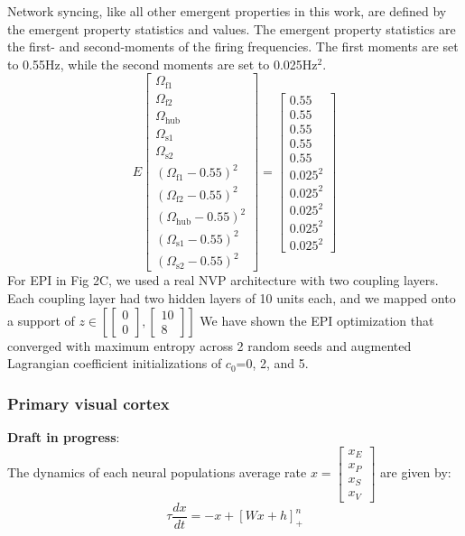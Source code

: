 \documentclass[11pt]{article}
\begin{document}
Network syncing, like all other emergent properties in this work, are defined by the emergent property statistics and values.  The emergent property statistics are the first- and second-moments of the firing frequencies. The first moments are set to 0.55Hz, while the second moments are set to 0.025Hz$^2$.
\begin{equation}
E \begin{bmatrix} \Omega_{\text{f1}} \\ \Omega_{\text{f2}} \\ \Omega_{\text{hub}} \\ \Omega_{\text{s1}} \\ \Omega_{\text{s2}} \\ (\Omega_{\text{f1}} - 0.55)^2 \\ (\Omega_{\text{f2}} - 0.55)^2 \\ (\Omega_{\text{hub}} - 0.55)^2 \\ (\Omega_{\text{s1}} - 0.55)^2 \\ (\Omega_{\text{s2}} - 0.55)^2  \end{bmatrix} = \begin{bmatrix} 0.55 \\ 0.55 \\ 0.55 \\ 0.55 \\ 0.55 \\ 0.025^2 \\ 0.025^2 \\ 0.025^2 \\ 0.025^2 \\ 0.025^2 \end{bmatrix}
\end{equation}
For EPI in Fig 2C, we used a real NVP architecture with two coupling layers.  Each coupling layer had two hidden layers of 10 units each, and we mapped onto a support of $z \in \left[ \begin{bmatrix} 0 \\ 0 \end{bmatrix}, \begin{bmatrix} 10 \\ 8 \end{bmatrix} \right]$  We have shown the EPI optimization that converged with maximum entropy across 2 random seeds and augmented Lagrangian coefficient initializations of $c_0$=0, 2, and 5.

\subsubsection{Primary visual cortex}\label{methods_V1}
\textbf{Draft in progress}: \\
The dynamics of each neural populations average rate
$x = \begin{bmatrix} x_E \\ x_P \\ x_S \\ x_V \end{bmatrix}$
are given by:
\begin{equation}
\tau \frac{dx}{dt} = -x + [W x+ h]_+^n
\end{equation}
\end{document}
